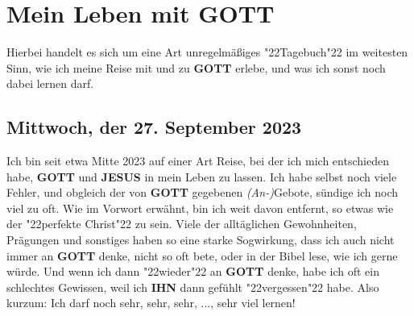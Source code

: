 \documentclass[12pt,a5paper]{article}
\newcommand{\Gott}[0]{\textbf{GOTT}}
\newcommand{\Ihn}[0]{\textbf{IHN}}
\newcommand{\Jesus}[0]{\textbf{JESUS}}
\newcommand{\q}[1]{\char"22{#1}\char"22 }
\begin{document}
	\newpage
	\section{Mein Leben mit {\Gott}} \label{MeinLebenMitGott}
		Hierbei handelt es sich um eine Art unregelm\"a{\ss}iges \q{Tagebuch} im weitesten Sinn,
		wie ich meine Reise mit und zu {\Gott} erlebe,
		und was ich sonst noch dabei lernen darf.
	
	\subsection{Mittwoch, der 27. September 2023}
		Ich bin seit etwa Mitte 2023 auf einer Art Reise,
		bei der ich mich entschieden habe,
		{\Gott} und {\Jesus} in mein Leben zu lassen.
		Ich habe selbst noch viele Fehler,
		und obgleich der von {\Gott} gegebenen \textit{(An-)}Gebote,
		s\"undige ich noch viel zu oft.
		Wie im Vorwort erw\"ahnt,
		bin ich weit davon entfernt,
		so etwas wie der \q{perfekte Christ} zu sein.
		Viele der allt\"aglichen Gewohnheiten,
		Pr\"agungen und sonstiges haben so eine starke Sogwirkung,
		dass ich auch nicht immer an {\Gott} denke,
		nicht so oft bete,
		oder in der Bibel lese,
		wie ich gerne w\"urde.
		Und wenn ich dann \q{wieder} an {\Gott} denke,
		habe ich oft ein schlechtes Gewissen,
		weil ich {\Ihn} dann gef\"uhlt \q{vergessen} habe.
		Also kurzum:
		Ich darf noch sehr, sehr, sehr, ..., sehr viel lernen!
		
\end{document}
